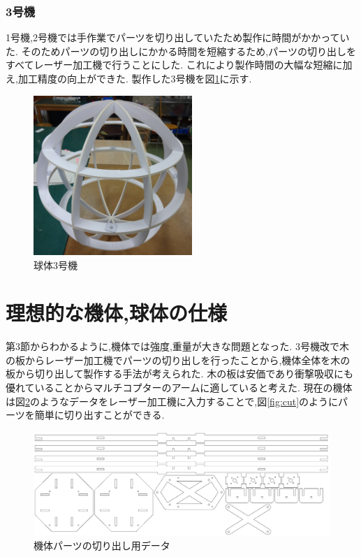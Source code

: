 \documentclass[12pt,oneside]{sotsuken_paper}
\begin{document}
\subsubsection{3号機}
1号機,2号機では手作業でパーツを切り出していたため製作に時間がかかっていた.
そのためパーツの切り出しにかかる時間を短縮するため,パーツの切り出しをすべてレーザー加工機で行うことにした.
これにより製作時間の大幅な短縮に加え,加工精度の向上ができた.
製作した3号機を図\ref{fig:sphere-3}に示す.

\begin{figure}[htbp]
	\begin{center}
		\includegraphics[width=60mm]{image/sphere/sphere-3.jpg}
		\caption{球体3号機}
		\label{fig:sphere-3}
	\end{center}
\end{figure}

\section{理想的な機体,球体の仕様}
第3節からわかるように,機体では強度,重量が大きな問題となった.
3号機改で木の板からレーザー加工機でパーツの切り出しを行ったことから,機体全体を木の板から切り出して製作する手法が考えられた.
木の板は安価であり衝撃吸収にも優れていることからマルチコプターのアームに適していると考えた.
現在の機体は図\ref{fig:CD-data}のようなデータをレーザー加工機に入力することで,図\ref{fig:cut}のようにパーツを簡単に切り出すことができる.

\begin{figure}[htbp]
	\begin{center}
		\includegraphics[width=120mm]{image/drone/CD-data.jpg}
		\caption{機体パーツの切り出し用データ}
		\label{fig:CD-data}
	\end{center}
\end{figure}
\end{document}
